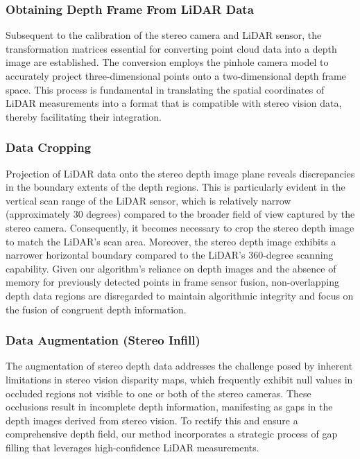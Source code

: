 \documentclass[conference]{IEEEtran}
\begin{document}
\subsubsection{Obtaining Depth Frame From LiDAR Data}

Subsequent to the calibration of the stereo camera and LiDAR sensor, the transformation matrices essential for converting point cloud data into a depth image are established. The conversion employs the pinhole camera model to accurately project three-dimensional points onto a two-dimensional depth frame space. This process is fundamental in translating the spatial coordinates of LiDAR measurements into a format that is compatible with stereo vision data, thereby facilitating their integration.

\subsubsection{Data Cropping}

Projection of LiDAR data onto the stereo depth image plane reveals discrepancies in the boundary extents of the depth regions. This is particularly evident in the vertical scan range of the LiDAR sensor, which is relatively narrow (approximately 30 degrees) compared to the broader field of view captured by the stereo camera. Consequently, it becomes necessary to crop the stereo depth image to match the LiDAR's scan area. Moreover, the stereo depth image exhibits a narrower horizontal boundary compared to the LiDAR's 360-degree scanning capability. Given our algorithm's reliance on depth images and the absence of memory for previously detected points in frame sensor fusion, non-overlapping depth data regions are disregarded to maintain algorithmic integrity and focus on the fusion of congruent depth information.

\subsubsection{Data Augmentation (Stereo Infill)}

The augmentation of stereo depth data addresses the challenge posed by inherent limitations in stereo vision disparity maps, which frequently exhibit null values in occluded regions not visible to one or both of the stereo cameras. These occlusions result in incomplete depth information, manifesting as gaps in the depth images derived from stereo vision. To rectify this and ensure a comprehensive depth field, our method incorporates a strategic process of gap filling that leverages high-confidence LiDAR measurements.
\end{document}
